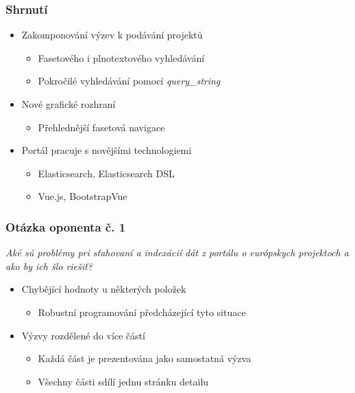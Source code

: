 \documentclass[10pt,xcolor=pdflatex]{beamer}
\begin{document}
\begin{frame}
    \frametitle{Shrnutí}
    \begin{itemize}
        \item Zakomponování výzev k podávání projektů
        \begin{itemize}
            \item Fasetového i plnotextového vyhledávání
            \item Pokročilé vyhledávání pomocí \emph{query\_string}
        \end{itemize}
        
        \item Nové grafické rozhraní
        \begin{itemize}
            \item Přehlednější fasetová navigace
        \end{itemize}
        
        \item Portál pracuje s novějšími technologiemi
        \begin{itemize}
            \item Elasticsearch, Elasticsearch DSL
            \item Vue.js, BootstrapVue
        \end{itemize}

    \end{itemize}
\end{frame}

\appendix

\begin{frame}
    \frametitle{Otázka oponenta č. 1}
    \emph{Aké sú problémy pri sťahovaní a indexácií dát z portálu o európskych projektoch a ako by ich šlo riešiť?}
    \begin{itemize}
        \item Chybějící hodnoty u některých položek
        \begin{itemize}
            \item Robustní programování předcházející tyto situace
        \end{itemize}
        \item Výzvy rozdělené do více částí
        \begin{itemize}
            \item Každá část je prezentována jako samostatná výzva
            \item Všechny části sdílí jednu stránku detailu
        \end{itemize}
    \end{itemize}
\end{frame}
\end{document}

